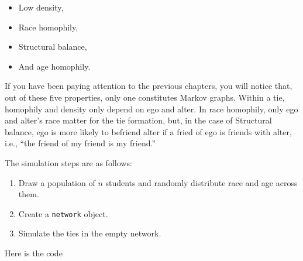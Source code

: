 \documentclass[
]{book}
\providecommand{\tightlist}{%
  \setlength{\itemsep}{0pt}\setlength{\parskip}{0pt}}
\begin{document}
\begin{itemize}
\tightlist
\item
  Low density,
\item
  Race homophily,
\item
  Structural balance,
\item
  And age homophily.
\end{itemize}

If you have been paying attention to the previous chapters, you will notice that,
out of these five properties, only one constitutes Markov graphs. Within a tie,
homophily and density only depend on ego and alter. In race homophily, only ego
and alter's race matter for the tie formation, but, in the case of Structural
balance, ego is more likely to befriend alter if a fried of ego is friends with alter,
i.e., ``the friend of my friend is my friend.''

The simulation steps are as follows:

\begin{enumerate}
\def\labelenumi{\arabic{enumi}.}
\item
  Draw a population of \(n\) students and randomly distribute race and age across them.
\item
  Create a \texttt{network} object.
\item
  Simulate the ties in the empty network.
\end{enumerate}

Here is the code
\end{document}
